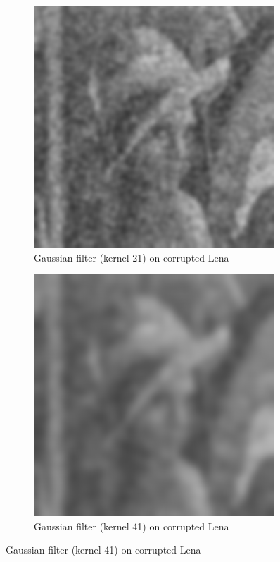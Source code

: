 \documentclass{article}
\begin{document}
\begin{figure}[H]
\begin{subfigure}{0.3\textwidth}
		\includegraphics[width=\textwidth]{Generated/Lena_corrupted_gaussian21filter.png}
		\caption{Gaussian filter (kernel 21) on corrupted Lena}
		\label{fig:gaussian21_Lena}
	\end{subfigure}
	\hfill
	\begin{subfigure}{0.3\textwidth}
		\includegraphics[width=\textwidth]{Generated/Lena_corrupted_gaussian41filter.png}
		\caption{Gaussian filter (kernel 41) on corrupted Lena}
		\label{fig:gaussian41_Lena}
	\end{subfigure}


\end{figure}
\end{document}
